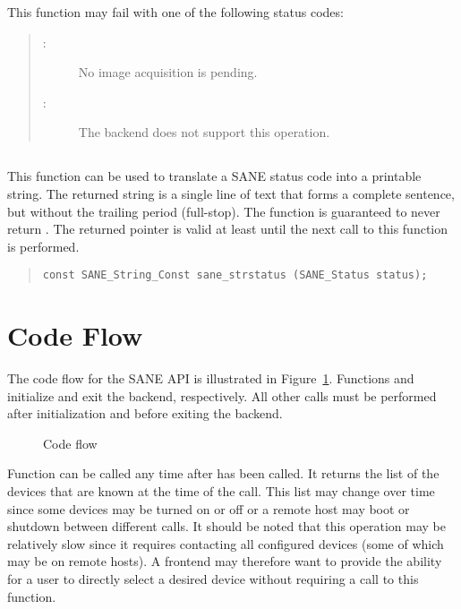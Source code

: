 \documentclass[11pt,DVIps]{report}
\begin{document}
This function may fail with one of the following status codes:
\begin{quote}
\begin{description}
\item[:] No image acquisition is pending.
\item[:] The backend does not support
  this operation.
\end{description}
\end{quote}


\subsection{}

This function can be used to translate a SANE status code into a
printable string.  The returned string is a single line of text that
forms a complete sentence, but without the trailing period
(full-stop).  The function is guaranteed to never return .
The returned pointer is valid at least until the next call to this
function is performed.
\begin{quote}
\begin{verbatim}
const SANE_String_Const sane_strstatus (SANE_Status status);
\end{verbatim}
\end{quote}

\section{Code Flow}

The code flow for the SANE API is illustrated in
Figure~\ref{fig:flow}.  Functions  and
 initialize and exit the backend, respectively.
All other calls must be performed after initialization and before
exiting the backend.

\begin{figure}[htb]
  \begin{center}
    \leavevmode
    \caption{Code flow}
    \label{fig:flow}
  \end{center}
\end{figure}

Function  can be called any time after
 has been called.  It returns the list of the
devices that are known at the time of the call.  This list may change
over time since some devices may be turned on or off or a remote host
may boot or shutdown between different calls.  It should be noted that
this operation may be relatively slow since it requires contacting all
configured devices (some of which may be on remote hosts).  A frontend
may therefore want to provide the ability for a user to directly
select a desired device without requiring a call to this function.
\end{document}
